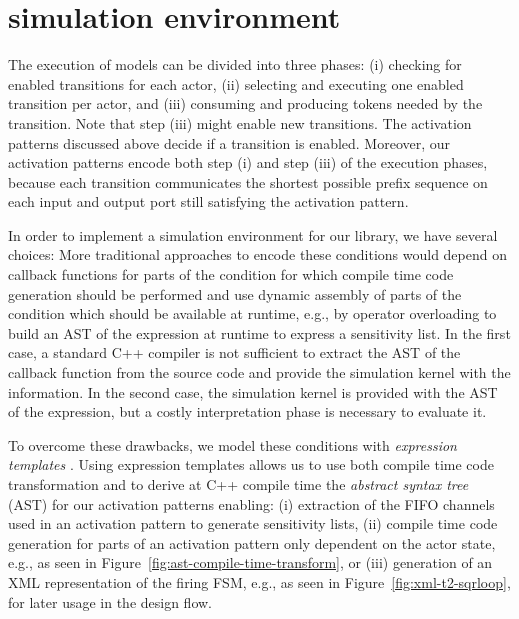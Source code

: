 \section{\SysteMoC{} simulation environment}\label{sec:systemoc-implementation}

The execution of \SysteMoC{} models can be divided into three phases:
(i)   checking for enabled transitions for each actor,
(ii)  selecting and executing one enabled transition per actor, and
(iii) consuming and producing tokens needed by the transition.
Note that step (iii) might enable new transitions.
The activation patterns discussed above decide if a transition is enabled.
Moreover, our activation patterns encode both step (i) and step (iii) of the execution phases, because each transition communicates the shortest possible prefix sequence on each input and output port still satisfying the activation pattern.

In order to implement a simulation environment for our \SysteMoC{} library, we have several choices:
More traditional approaches to encode these conditions would depend on callback functions for parts of the condition for which compile time code generation should be performed and use dynamic assembly of parts of the condition which should be available at runtime, e.g., by operator overloading to build an AST of the expression at runtime to express a sensitivity list.
In the first case, a standard C++ compiler is not sufficient to extract the AST of the callback function from the source code and provide the simulation kernel with the information.
In the second case, the simulation kernel is provided with the AST of the expression, but a costly interpretation phase is necessary to evaluate it.

To overcome these drawbacks, we model these conditions with \emph{expression templates} \cite{veldhuizen:1995}.
Using expression templates allows us to use both compile time code transformation and to derive at C++ compile time the \emph{abstract syntax tree} (AST) for our activation patterns enabling:
(i) extraction of the FIFO channels used in an activation pattern to generate sensitivity lists,
(ii) compile time code generation for parts of an activation pattern only dependent on the actor state, e.g., as seen in Figure~\ref{fig:ast-compile-time-transform}, or
(iii) generation of an XML representation of the firing FSM, e.g., as seen in Figure~\ref{fig:xml-t2-sqrloop}, for later usage in the design flow.

